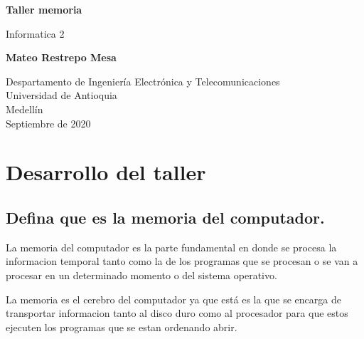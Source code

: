 \documentclass{article}
\begin{document}
\begin{titlepage}
    \begin{center}
        \vspace*{1cm}
            
        \Huge
        \textbf{Taller memoria}
            
        \vspace{0.5cm}
        \LARGE
        Informatica 2
            
        \vspace{1.5cm}
            
        \textbf{ Mateo Restrepo Mesa }
            
        \vfill
            
        \vspace{0.8cm}
            
        \Large
        Despartamento de Ingeniería Electrónica y Telecomunicaciones\\
        Universidad de Antioquia\\
        Medellín\\
        Septiembre de 2020
            
    \end{center}
\end{titlepage}



\section{Desarrollo del taller} \label{contenido}

\subsection{Defina que es la memoria del computador.}
La memoria del computador es la parte fundamental en donde se procesa la informacion temporal tanto como la de los programas que se procesan o se van a procesar en un determinado momento o del sistema operativo.

La memoria es el cerebro del computador ya que está es la que se encarga de transportar informacion tanto al disco duro como al procesador para que estos ejecuten los programas que se estan ordenando abrir.
\end{document}
